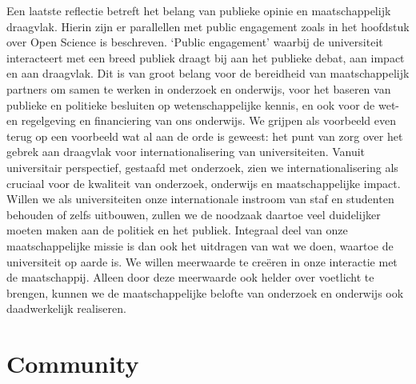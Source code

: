 \documentclass[empirical, authordate, ]{new-jote-article}
\begin{document}
	Een laatste reflectie betreft het belang van publieke opinie en maatschappelijk draagvlak. Hierin zijn er parallellen met public engagement zoals in het hoofdstuk over Open Science is beschreven. ‘Public engagement' waarbij de universiteit interacteert met een breed publiek draagt bij aan het publieke debat, aan impact en aan draagvlak. Dit is van groot belang voor de bereidheid van maatschappelijk partners om samen te werken in onderzoek en onderwijs, voor het baseren van publieke en politieke besluiten op wetenschappelijke kennis, en ook voor de wet- en regelgeving en financiering van ons onderwijs. We grijpen als voorbeeld even terug op een voorbeeld wat al aan de orde is geweest: het punt van zorg over het gebrek aan draagvlak voor internationalisering van universiteiten. Vanuit universitair perspectief, gestaafd met onderzoek, zien we internationalisering als cruciaal voor de kwaliteit van onderzoek, onderwijs en maatschappelijke impact. Willen we als universiteiten onze internationale instroom van staf en studenten behouden of zelfs uitbouwen, zullen we de noodzaak daartoe veel duidelijker moeten maken aan de politiek en het publiek. Integraal deel van onze maatschappelijke missie is dan ook het uitdragen van wat we doen, waartoe de universiteit op aarde is. We willen meerwaarde te creëren in onze interactie met de maatschappij. Alleen door deze meerwaarde ook helder over voetlicht te brengen, kunnen we de maatschappelijke belofte van onderzoek en onderwijs ook daadwerkelijk realiseren.







	\chapter{Community}



	\section{}



	\section{}



	\section{}
\end{document}
